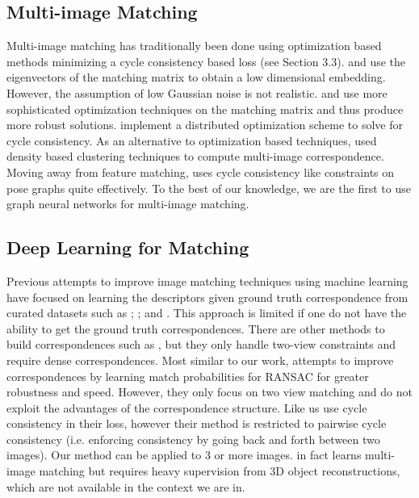 \documentclass{article} %
\begin{document}
\subsection{Multi-image Matching}
Multi-image matching has traditionally been done using optimization based methods minimizing a cycle consistency based loss (see Section 3.3).
\cite{pachauri2013solving} and \cite{arrigoni2017synchronization} use the eigenvectors of the matching matrix to obtain a low dimensional embedding. 
However, the assumption of low Gaussian noise is not realistic.
\cite{zhou2015multi} and \cite{wang2017multi} use more sophisticated optimization techniques on the matching matrix and thus produce more robust solutions.
\cite{leonardos2016distributed} implement a distributed optimization scheme to solve for cycle consistency.
As an alternative to optimization based techniques, \cite{tron2017fast} used density based clustering techniques to compute multi-image correspondence.
Moving away from feature matching, \cite{zach2010disambiguating} uses cycle consistency like constraints on pose graphs quite effectively.
To the best of our knowledge, we are the first to use graph neural networks for multi-image matching.

\subsection{Deep Learning for Matching}
Previous attempts to improve image matching techniques using machine learning have focused on learning the descriptors given ground truth correspondence from curated datasets such as \cite{zagoruyko2015learning}; \cite{yi2016lift}; and \cite{brachmann2017dsac}.
This approach is limited if one do not have the ability to get the ground truth correspondences.
There are other methods to build correspondences such as \cite{choy2016universal}, but they only handle two-view constraints and require dense correspondences.
Most similar to our work, \cite{yi2018learning} attempts to improve correspondences by learning match probabilities for RANSAC for greater robustness and speed.
However, they only focus on two view matching and do not exploit the advantages of the correspondence structure.
Like us \cite{zhu2017unpaired} use cycle consistency in their loss, however their method is restricted to pairwise cycle consistency (i.e. enforcing consistency by going back and forth between two images).
Our method can be applied to 3 or more images. 
\cite{hartmann2017learned} in fact learns multi-image matching but requires heavy supervision from 3D object reconstructions, which are not available in the context we are in.
\end{document}
